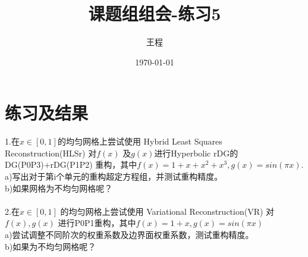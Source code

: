 \documentclass[a4paper,11pt,UTF8]{article}%
\theoremstyle{plain}
\begin{document}
	\title{\heiti 课题组组会-练习5}
	\author{王程 }
	\date{\today}
	\maketitle
	
	\section{练习及结果}
	1.在$x\in \left[0,1\right]$的均匀网格上尝试使用 Hybrid Least Squares Reconstruction(HLSr) 对$f\left(x\right)$ 及$g\left(x\right)$进行Hyperbolic rDG的DG(P0P3)+rDG(P1P2) 重构，其中$f\left(x\right)=1+x+x^2+x^3, g\left(x\right)=sin\left(\pi x\right)$.\\
	\indent a)写出对于第i个单元的重构超定方程组，并测试重构精度。\\
	\indent b)如果网格为不均匀网格呢？\\
	~\\
	\indent 2.在$x\in \left[0,1\right]$ 的均匀网格上尝试使用 Variational Reconstruction(VR) 对$f\left(x\right),g\left(x\right)$ 进行P0P1重构，其中$f\left(x\right)=1+x, g\left(x\right)=sin\left(\pi x\right)$\\
	\indent a)尝试调整不同阶次的权重系数及边界面权重系数，测试重构精度。\\
	\indent b)如果为不均匀网格呢？\\
	
\end{document}
